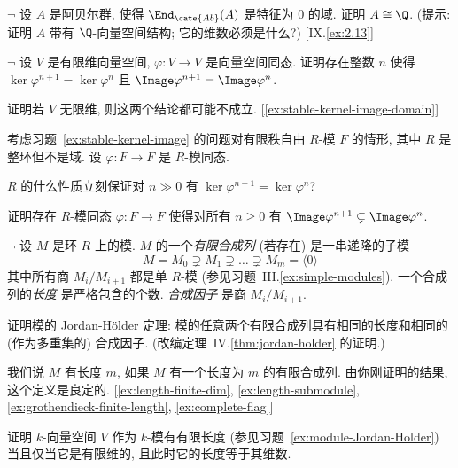 \begin{prob}
\label{ex:abelian-group-end-field}
$\neg$ 设 $A$ 是阿贝尔群, 使得 $\End_{\cate{Ab}}(A)$ 是特征为 $0$ 的域. 证明 $A\cong\Q$. (提示: 证明 $A$ 带有 $\Q$-向量空间结构; 它的维数必须是什么?) [IX.\ref{ex:2.13}]
\end{prob}

\begin{prob}
\label{ex:stable-kernel-image}
$\neg$ 设 $V$ 是有限维向量空间, $\varphi:V\to V$ 是向量空间同态. 证明存在整数 $n$ 使得 $\ker\varphi^{n+1}=\ker\varphi^n$ 且 $\Image\varphi^{n+1}=\Image\varphi^n$.

证明若 $V$ 无限维, 则这两个结论都可能不成立. [\ref{ex:stable-kernel-image-domain}]
\end{prob}

\begin{prob}
\label{ex:stable-kernel-image-domain}
考虑习题~\ref{ex:stable-kernel-image} 的问题对有限秩自由 $R$-模 $F$ 的情形, 其中 $R$ 是整环但不是域. 设 $\varphi:F\to F$ 是 $R$-模同态.

$R$ 的什么性质立刻保证对 $n\gg0$ 有 $\ker\varphi^{n+1}=\ker\varphi^n$?

证明存在 $R$-模同态 $\varphi:F\to F$ 使得对所有 $n\ge0$ 有 $\Image\varphi^{n+1}\subsetneq\Image\varphi^n$.
\end{prob}

\begin{prob}
\label{ex:module-Jordan-Holder}
$\neg$ 设 $M$ 是环 $R$ 上的模. $M$ 的一个\emph{有限合成列} (若存在) 是一串递降的子模
\[
M = M_0 \supsetneq M_1 \supsetneq \dots \supsetneq M_m = \langle 0\rangle
\]
其中所有商 $M_i/M_{i+1}$ 都是单 $R$-模 (参见习题~III.\ref{ex:simple-modules}). 一个合成列的\emph{长度} 是严格包含的个数. \emph{合成因子} 是商 $M_i/M_{i+1}$.

证明模的 Jordan-Hölder 定理: 模的任意两个有限合成列具有相同的长度和相同的 (作为多重集的) 合成因子. (改编定理~IV.\ref{thm:jordan-holder} 的证明.)

我们说 $M$ 有长度 $m$, 如果 $M$ 有一个长度为 $m$ 的有限合成列. 由你刚证明的结果, 这个定义是良定的. [\ref{ex:length-finite-dim}, \ref{ex:length-submodule}, \ref{ex:grothendieck-finite-length}, \ref{ex:complete-flag}]
\end{prob}

\begin{prob}
\label{ex:length-finite-dim}
证明 $k$-向量空间 $V$ 作为 $k$-模有有限长度 (参见习题~\ref{ex:module-Jordan-Holder}) 当且仅当它是有限维的, 且此时它的长度等于其维数.
\end{prob}


